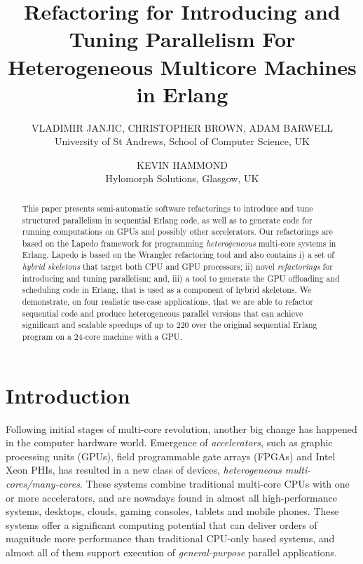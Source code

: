 \documentclass[final]{jfp1}
\title[Refactoring for Heterogeneous Parallelism in Erlang]
      {Refactoring for Introducing and Tuning Parallelism For Heterogeneous Multicore Machines in Erlang}
\author[V. Janjic et al]{VLADIMIR JANJIC, CHRISTOPHER BROWN, ADAM BARWELL \\
         University of St Andrews, School of Computer Science, UK\\
         \email{vj32@st-andrews.ac.uk, cmb21@st-andrews.ac.uk, adb23@st-andrews.ac.uk, kevin@kevinhammond.net} 
}
\author[K. Hammond]{KEVIN HAMMOND \\ Hylomorph Solutions, Glasgow, UK \\
	\email{kevin@kevinhammond.net}
}
\newcommand{\lapedo}{\xspace{\sc Lapedo}\xspace}
\newcommand{\Lapedo}{\lapedo}
\begin{document}
\label{firstpage}

\maketitle

\begin{abstract}
  This paper presents semi-automatic software refactorings to introduce and tune structured parallelism in sequential Erlang code, as well as to generate code for running computations on GPUs and possibly other accelerators. Our refactorings are based on the \Lapedo{} framework for programming
  \emph{heterogeneous} multi-core systems in Erlang. \Lapedo{} is based on the Wrangler refactoring tool and also contains i) a set of \emph{hybrid
    skeletons} that target both CPU and GPU processors; ii) novel \emph{refactorings} for introducing and tuning parallelism; and, iii) a tool to generate the GPU offloading and scheduling code in Erlang, that is used as a component of hybrid skeletons.
  We demonstrate, on four realistic use-case applications, that we are able to refactor 
  sequential code and produce heterogeneous parallel versions that can achieve significant and scalable speedups of up to 220
  over the original sequential Erlang program on a 24-core
  machine with a GPU. %
\end{abstract}


\section{Introduction}
\vspace{-6pt}
\noindent
Following initial stages of multi-core revolution, another big change has happened in the computer hardware world. Emergence of
\emph{accelerators}, such as graphic processing units (GPUs),
field programmable gate arrays (FPGAs) and Intel Xeon PHIs, has
resulted in a new class of devices, \emph{heterogeneous multi-cores/many-cores}.
These systems combine traditional multi-core CPUs with one or more
accelerators, and are nowadays found in almost all high-performance systems,
desktops, clouds, gaming consoles, tablets and mobile phones.
These systems
offer a significant computing potential that can deliver orders of magnitude
more performance than traditional CPU-only based systems, and almost all
of them support execution of \emph{general-purpose} parallel applications.
\end{document}
